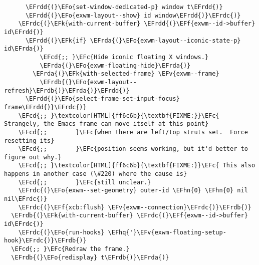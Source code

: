 \documentclass[a4wide,10pt]{article}
\newcommand{\EFc}[1]{\textcolor{EFc}{#1}} %
\newcommand{\EFcd}[1]{\textcolor{EFcd}{#1}} %
\newcommand{\EFk}[1]{\textcolor{EFk}{#1}} %
\newcommand{\EFf}[1]{\textcolor{EFf}{#1}} %
\newcommand{\EFv}[1]{\textcolor{EFv}{#1}} %
\newcommand{\EFo}[1]{\textcolor{EFo}{#1}} %
\newcommand{\EFhn}[1]{\textcolor{EFhn}{\textbf{#1}}} %
\newcommand{\EFhq}[1]{\textcolor{EFhq}{#1}} %
\newcommand{\EFrda}[1]{\textcolor{EFrda}{#1}} %
\newcommand{\EFrdb}[1]{\textcolor{EFrdb}{#1}} %
\newcommand{\EFrdc}[1]{\textcolor{EFrdc}{#1}} %
\newcommand{\EFrdd}[1]{\textcolor{EFrdd}{#1}} %
\begin{document}
\begin{Code}
\begin{Verbatim}
      \EFrdd{(}\EFo{set-window-dedicated-p} window t\EFrdd{)}
      \EFrdd{(}\EFo{exwm-layout--show} id window\EFrdd{)}\EFrdc{)}
    \EFrdc{(}\EFk{with-current-buffer} \EFrdd{(}\EFf{exwm--id->buffer} id\EFrdd{)}
      \EFrdd{(}\EFk{if} \EFrda{(}\EFo{exwm-layout--iconic-state-p} id\EFrda{)}
          \EFcd{;; }\EFc{Hide iconic floating X windows.}
          \EFrda{(}\EFo{exwm-floating-hide}\EFrda{)}
        \EFrda{(}\EFk{with-selected-frame} \EFv{exwm--frame}
          \EFrdb{(}\EFo{exwm-layout--refresh}\EFrdb{)}\EFrda{)}\EFrdd{)}
      \EFrdd{(}\EFo{select-frame-set-input-focus} frame\EFrdd{)}\EFrdc{)}
    \EFcd{;; }\textcolor[HTML]{ff6c6b}{\textbf{FIXME:}}\EFc{ Strangely, the Emacs frame can move itself at this point}
    \EFcd{;;        }\EFc{when there are left/top struts set.  Force resetting its}
    \EFcd{;;        }\EFc{position seems working, but it'd better to figure out why.}
    \EFcd{;; }\textcolor[HTML]{ff6c6b}{\textbf{FIXME:}}\EFc{ This also happens in another case (\#220) where the cause is}
    \EFcd{;;        }\EFc{still unclear.}
    \EFrdc{(}\EFo{exwm--set-geometry} outer-id \EFhn{0} \EFhn{0} nil nil\EFrdc{)}
    \EFrdc{(}\EFf{xcb:flush} \EFv{exwm--connection}\EFrdc{)}\EFrdb{)}
  \EFrdb{(}\EFk{with-current-buffer} \EFrdc{(}\EFf{exwm--id->buffer} id\EFrdc{)}
    \EFrdc{(}\EFo{run-hooks} \EFhq{'}\EFv{exwm-floating-setup-hook}\EFrdc{)}\EFrdb{)}
  \EFcd{;; }\EFc{Redraw the frame.}
  \EFrdb{(}\EFo{redisplay} t\EFrdb{)}\EFrda{)}


\end{Verbatim}
\end{Code}
\end{document}
